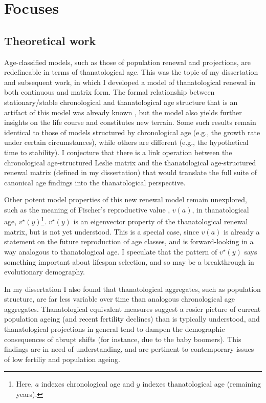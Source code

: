 \documentclass[a4paper,12pt]{article}
\begin{document}
\section{Focuses}
\subsection{Theoretical work}
Age-classified models, such as those of population renewal and projections, are
redefineable in terms of thanatological age. This was the topic of my
dissertation and subsequent work, in which I developed a model of thanatological
renewal in both continuous and matrix form. The formal relationship between stationary/stable chronological and
thanatological age structure that is an artifact of this model was already known
\cite{wachter2014essential,vaupel2009life,brouard1989mouvements}, but the model
also yields further insights on the life course and constitutes new
terrain. Some such results remain identical to those of models structured by
chronological age (e.g., the growth rate under certain circumstances), while
others are different (e.g., the hypothetical time to stability). I conjecture
that there is a link operation between the chronological age-structured Leslie
matrix and the thanatological age-structured renewal matrix (defined in my dissertation) that would translate the full suite of canonical age findings into the thanatological perspective.

Other potent model properties of this new renewal model remain unexplored, such
as the meaning of Fischer's reproductive value \cite{fisher1958genetical}, $v(a)$, in
thanatological age, $v^\star (y)$\footnote{Here, $a$ indexes
chronological age and $y$ indexes thanatological age (remaining years).}.
$v^\star (y)$ is an eigenvector property of the thanatological renewal matrix,
but is not yet understood. This is a special case, since $v(a)$ is already a
statement on the future reproduction of age classes, and is forward-looking in a way
analogous to thanatological age. I speculate that the pattern of $v^\star (y)$
says something important about lifespan selection, and so may be a
breakthrough in evolutionary demography.

In my dissertation I also found that thanatological aggregates, such as
population structure, are far less variable over time than analogous chronological age aggregates. Thanatological equivalent measures suggest a rosier
picture of current population ageing (and recent fertility declines) than is
typically understood, and thanatological projections in general tend to dampen
the demographic consequences of abrupt shifts (for instance, due to the baby
boomers). This findings are in need of understanding, and are pertinent to
contemporary issues of low fertiliy and population ageing.
\end{document}
